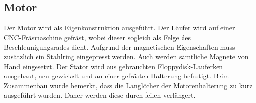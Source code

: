 \subsection{Motor}
Der Motor wird als Eigenkonstruktion ausgeführt. Der Läufer wird auf einer 
CNC-Fräsmaschine gefräst, wobei dieser sogleich als Felge des 
Beschleunigungsrades dient. Aufgrund der magnetischen Eigenschaften muss 
zusätzlich ein Stahlring eingepresst werden. Auch werden sämtliche Magnete von 
Hand eingesetzt. Der Stator wird aus gebrauchten Floppydisk-Lauferken 
ausgebaut, neu gewickelt und an einer gefrästen Halterung befestigt.
Beim Zusammenbau wurde bemerkt, dass die Langlöcher der Motorenhalterung zu kurz ausgeführt wurden. Daher werden diese durch feilen verlängert.
